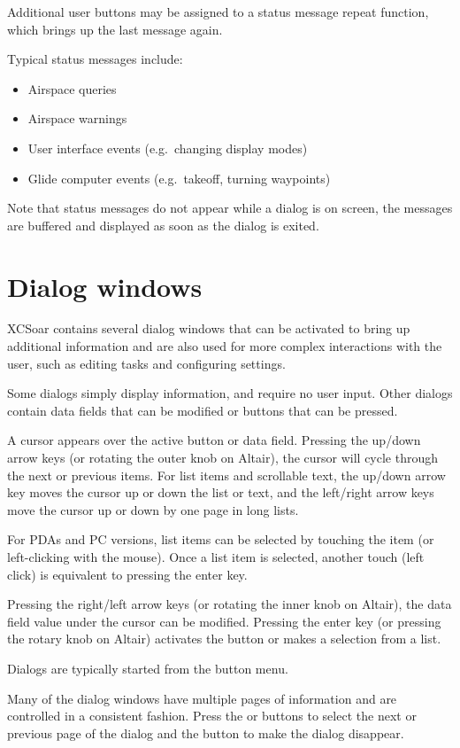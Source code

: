 Additional user buttons may be assigned to a status message repeat function,
which brings up the last message again.

Typical status messages include:
\begin{itemize}
\item Airspace queries
\item Airspace warnings
\item User interface events (e.g.\ changing display modes)
\item Glide computer events (e.g.\ takeoff, turning waypoints)
\end{itemize}

Note that status messages do not appear while a dialog is on screen, the
messages are buffered and displayed as soon as the dialog is exited.

\section{Dialog windows}\label{sec:dialog-windows}

XCSoar contains several dialog windows that can be activated to bring up
additional information and are also used for more complex interactions with the
user, such as editing tasks and configuring settings.

Some dialogs simply display information, and require no user input. Other
dialogs contain data fields that can be modified or buttons that can be pressed.  

A cursor appears over the active button or data field. Pressing the up/down
arrow keys (or rotating the outer knob on Altair), the cursor will cycle
through the next or previous items. For list items and scrollable text, the
up/down arrow key moves the cursor up or down the list or text, and the
left/right arrow keys move the cursor up or down by one page in long lists.

For PDAs and PC versions, list items can be selected by touching the item (or
left-clicking with the mouse). Once a list item is selected, another touch
(left click) is equivalent to pressing the enter key.

Pressing the right/left arrow keys (or rotating the inner knob on Altair), the
data field value under the cursor can be modified. Pressing the enter key (or
pressing the rotary knob on Altair) activates the button or makes a selection
from a list.

Dialogs are typically started from the button menu.  

Many of the dialog windows have multiple pages of information and are controlled
in a consistent fashion. Press the \button{$<$} or \button{$>$} buttons to
select the next or previous page of the dialog and the  button to
make the dialog disappear.

